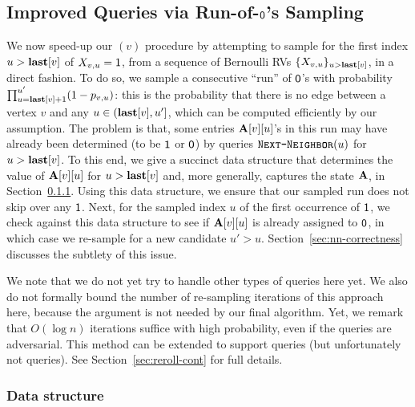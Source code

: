 \subsection{Improved  Queries via Run-of-$\mathsf{0}$'s Sampling}\label{sec:ER-rand}

We now speed-up our $(v)$ procedure by attempting to sample for the first index $u > \mathbf{last}[v]$ of $X_{v,u}=\mathsf{1}$, from a sequence of Bernoulli RVs $\{X_{v, u}\}_{u > \mathbf{last}[v]}$, in a direct fashion. To do so, we sample a consecutive ``run'' of $\mathsf{0}$'s with probability $\prod_{u=\mathbf{last}[v]+1}^{u'} (1-p_{v,u})$: this is the probability that there is no edge between a vertex $v$ and any $u \in (\mathbf{last}[v],u']$, which can be computed efficiently by our assumption. The problem is that, some entries $\mathbf{A}[v][u]$'s in this run may have already been determined (to be $\mathsf{1}$ or $\mathsf{0}$) by queries $\texttt{\textsc{Next-Neighbor}}(u)$ for $u > \mathbf{last}[v]$. To this end, we give a succinct data structure that determines the value of $\mathbf{A}[v][u]$ for $u >\mathbf{last}[v]$ and, more generally, captures the state $\mathbf{A}$, in Section~\ref{sec:nn-ds}. Using this data structure, we ensure that our sampled run does not skip over any $\mathsf{1}$. Next, for the sampled index $u$ of the first occurrence of $\mathsf{1}$, we check against this data structure to see if $\mathbf{A}[v][u]$ is already assigned to $\mathsf{0}$, in which case we re-sample for a new candidate $u' > u$. Section~\ref{sec:nn-correctness} discusses the subtlety of this issue.

We note that we do not yet try to handle other types of queries here yet. We also do not formally bound the number of re-sampling iterations of this approach here, because the argument is not needed by our final algorithm. Yet, we remark that $O(\log n)$ iterations suffice with high probability, even if the queries are adversarial. This method can be extended to support  queries (but unfortunately not  queries). See Section~\ref{sec:reroll-cont} for full details.

\subsubsection{Data structure}\label{sec:nn-ds}

